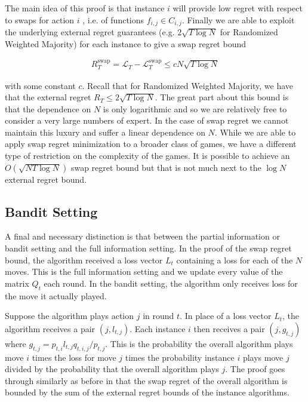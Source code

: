 \documentclass{article}
\begin{document}
The main idea of this proof is that instance $i$ will provide low regret with respect to swaps for action $i$ , i.e. of functions $f_{i,j} \in C_{i,j}$. Finally we are able to exploit the underlying external regret guarantees (e.g. $2\sqrt{T \log N}$ for Randomized Weighted Majority) for each instance to give a swap regret bound

\begin{align*}
R_T^{\text{swap}} = \mathcal{L}_T - \mathcal{L}_T^{\text{swap}} \le c N\sqrt{T \log N}
\end{align*}

with some constant $c$. Recall that for Randomized Weighted Majority, we have that the external regret $R_T \le 2\sqrt{T \log N}$. The great part about this bound is that the dependence on $N$ is only logarithmic and so we are relatively free to consider a very large numbers of expert. In the case of swap regret we cannot maintain this luxury and suffer a linear dependence on $N$. While we are able to apply swap regret minimization to a broader class of games, we have a different type of restriction on the complexity of the games. It is possible to achieve an $O(\sqrt{N T \log N})$ swap regret bound but that is not much next to the $\log N$ external regret bound.

\subsection{Bandit Setting}

A final and necessary distinction is that between the partial information or bandit setting and the full information setting. In the proof of the swap regret bound, the algorithm received a loss vector $L_t$ containing a loss for each of the $N$ moves. This is the full information setting and we update every value of the matrix $Q_t$ each round. In the bandit setting, the algorithm only receives loss for the move it actually played.

Suppose the algorithm plays action $j$ in round $t$. In place of a loss vector $L_t$, the algorithm receives a pair $(j, l_{t,j})$. Each instance $i$ then receives a pair $(j, g_{t,j})$ where $g_{t,j} = p_{t,i}l_{t,j}q_{t,i,j}/p_{t,j}$. This is the probability the overall algorithm plays move $i$ times the loss for move $j$ times the probability instance $i$ plays move $j$ divided by the probability that the overall algorithm plays $j$. The proof goes through similarly as before in that the swap regret of the overall algorithm is bounded by the sum of the external regret bounds of the instance algorithms.
\end{document}
